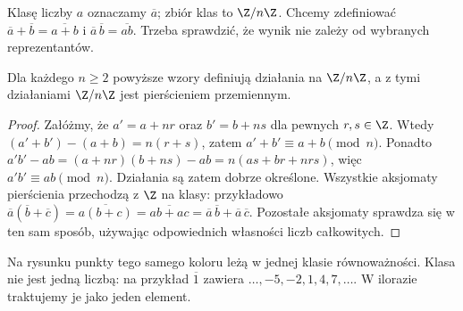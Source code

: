 Klasę liczby $a$ oznaczamy $\overline a$; zbiór klas to $\Z/n\Z$.
Chcemy zdefiniować $\overline a+\overline b=\overline{a+b}$ i
$\overline a\,\overline b=\overline{ab}$. Trzeba sprawdzić,
że wynik nie zależy od wybranych reprezentantów.

\begin{stwierdzenie}
\label{st:modulo}
Dla każdego $n\ge2$ powyższe wzory definiują działania na $\Z/n\Z$,
a z tymi działaniami $\Z/n\Z$ jest pierścieniem przemiennym.
\end{stwierdzenie}
\begin{proof}
Załóżmy, że $a'=a+nr$ oraz $b'=b+ns$ dla pewnych $r,s\in\Z$.
Wtedy $(a'+b')-(a+b)=n(r+s)$, zatem $a'+b'\equiv a+b\pmod n$.
Ponadto
$a'b'-ab=(a+nr)(b+ns)-ab=n(as+br+nrs)$,
więc $a'b'\equiv ab\pmod n$. Działania są zatem dobrze określone.
Wszystkie aksjomaty pierścienia przechodzą z $\Z$ na klasy:
przykładowo $\overline a(\overline b+\overline c)
=\overline{a(b+c)}=\overline{ab+ac}
=\overline a\,\overline b+\overline a\,\overline c$.
Pozostałe aksjomaty sprawdza się w ten sam sposób, używając
odpowiednich własności liczb całkowitych.
\end{proof}

\begin{center}
\end{center}

Na rysunku punkty tego samego koloru leżą w jednej klasie równoważności.
Klasa nie jest jedną liczbą: na przykład $\overline1$ zawiera
$\dots,-5,-2,1,4,7,\dots$. W ilorazie traktujemy je jako jeden element.

